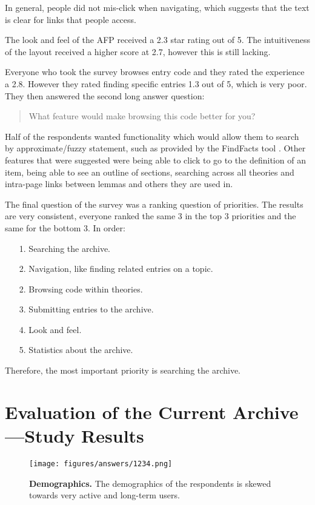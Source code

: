 \documentclass[bsc,frontabs,oneside,singlespacing,parskip,deptreport,logo]{infthesis}
\begin{document}
In general, people did not mis-click when navigating, which suggests that the text is clear for links that people access.

The look and feel of the AFP received a 2.3 star rating out of 5. The intuitiveness of the layout received a higher score at 2.7, however this is still lacking.

Everyone who took the survey browses entry code and they rated the experience a 2.8. However they rated finding specific entries 1.3 out of 5, which is very poor. They then answered the second long answer question: 
\begin{quote}
    What feature would make browsing this code better for you?
\end{quote}
Half of the respondents wanted functionality which would allow them to search by approximate/fuzzy statement, such as provided by the FindFacts tool \cite{HuchKrauss}. Other features that were suggested were being able to click to go to the definition of an item, being able to see an outline of sections, searching across all theories and intra-page links between lemmas and others they are used in.

The final question of the survey was a ranking question of priorities. The results are very consistent, everyone ranked the same 3 in the top 3 priorities and the same for the bottom 3. In order:

\begin{itemize}
    \item [1.] Searching the archive.
    \item [2.] Navigation, like finding related entries on a topic.
    \item [2.] Browsing code within theories.
    \item [3.] Submitting entries to the archive.
    \item [4.] Look and feel.
    \item [5.] Statistics about the archive.
\end{itemize}

Therefore, the most important priority is searching the archive. 

\chapter{Evaluation of the Current Archive---Study Results}
\label{appendix-afp-eval}

\begin{figure}[ht]
    \centering
    \texttt{[image: figures/answers/1234.png]}
    \caption{\textbf{Demographics.}
    The demographics of the respondents is skewed towards very active and long-term users.}
    \label{fig:demographics}
\end{figure}
\end{document}
